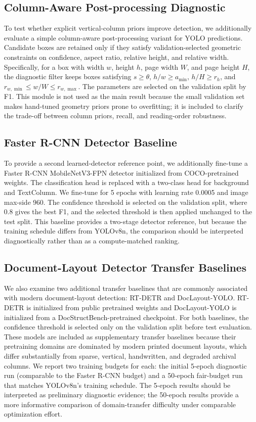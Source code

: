 \documentclass[pdflatex,sn-mathphys-num]{sn-jnl}
\begin{document}
\subsection{Column-Aware Post-processing Diagnostic}
To test whether explicit vertical-column priors improve detection, we additionally evaluate a simple column-aware post-processing variant for YOLO predictions. Candidate boxes are retained only if they satisfy validation-selected geometric constraints on confidence, aspect ratio, relative height, and relative width. Specifically, for a box with width $w$, height $h$, page width $W$, and page height $H$, the diagnostic filter keeps boxes satisfying $s\geq\theta$, $h/w\geq a_{\min}$, $h/H\geq r_h$, and $r_{w,\min}\leq w/W\leq r_{w,\max}$. The parameters are selected on the validation split by F1. This module is not used as the main result because the small validation set makes hand-tuned geometry priors prone to overfitting; it is included to clarify the trade-off between column priors, recall, and reading-order robustness.

\subsection{Faster R-CNN Detector Baseline}
To provide a second learned-detector reference point, we additionally fine-tune a Faster R-CNN MobileNetV3-FPN detector initialized from COCO-pretrained weights. The classification head is replaced with a two-class head for background and TextColumn. We fine-tune for 5 epochs with learning rate 0.0005 and image max-side 960. The confidence threshold is selected on the validation split, where 0.8 gives the best F1, and the selected threshold is then applied unchanged to the test split. This baseline provides a two-stage detector reference, but because the training schedule differs from YOLOv8n, the comparison should be interpreted diagnostically rather than as a compute-matched ranking.

\subsection{Document-Layout Detector Transfer Baselines}
We also examine two additional transfer baselines that are commonly associated with modern document-layout detection: RT-DETR and DocLayout-YOLO. RT-DETR is initialized from public pretrained weights and DocLayout-YOLO is initialized from a DocStructBench-pretrained checkpoint. For both baselines, the confidence threshold is selected only on the validation split before test evaluation. These models are included as supplementary transfer baselines because their pretraining domains are dominated by modern printed document layouts, which differ substantially from sparse, vertical, handwritten, and degraded archival columns. We report two training budgets for each: the initial 5-epoch diagnostic run (comparable to the Faster R-CNN budget) and a 50-epoch fair-budget run that matches YOLOv8n's training schedule. The 5-epoch results should be interpreted as preliminary diagnostic evidence; the 50-epoch results provide a more informative comparison of domain-transfer difficulty under comparable optimization effort.
\end{document}
